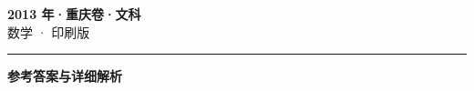 \documentclass[zihao=5, a4paper]{ctexart}
\begin{document}
\begin{center}
  {\Large\bfseries 2013 年·重庆卷·文科}\\[4pt]
  {\large 数学 · 印刷版}
\end{center}
\medskip
{}

\par\bigskip\hrule\bigskip
{}
\Needspace{0.55\textheight}
\begin{center}{\large\bfseries 参考答案与详细解析}\end{center}
\smallskip

\end{document}
